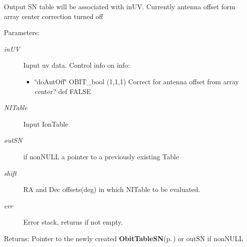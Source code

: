 Output SN table will be associated with in\-UV. Currently antenna offset form array center correction turned off \begin{Desc}
\item[Parameters:]
\begin{description}
\item[{\em in\-UV}]Input uv data. Control info on info: \begin{itemize}
\item \char`\"{}do\-Ant\-Off\char`\"{} OBIT\_\-bool (1,1,1) Correct for antenna offset from array center? def FALSE \end{itemize}
\item[{\em NITable}]Input Ion\-Table \item[{\em out\-SN}]if non\-NULL a pointer to a previously existing Table \item[{\em shift}]RA and Dec offsets(deg) in which NITable to be evaluated. \item[{\em err}]Error stack, returns if not empty. \end{description}
\end{Desc}
\begin{Desc}
\item[Returns:]Pointer to the newly created {\bf Obit\-Table\-SN}{\rm (p.\,\pageref{structObitTableSN})} or out\-SN if non\-NULL \end{Desc}
